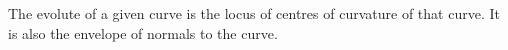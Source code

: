 The evolute of a given curve is the locus of centres of curvature of that curve.
It is also the envelope of normals to the curve.
